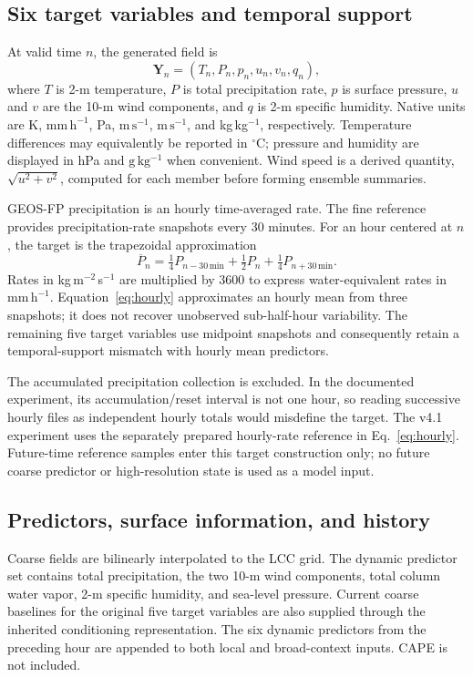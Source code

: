 \documentclass[10pt]{article}
\newcommand{\rainunit}{\mathrm{mm\,h^{-1}}}
\newcommand{\windunit}{\mathrm{m\,s^{-1}}}
\newcommand{\qrate}{\mathrm{g\,kg^{-1}}}
\begin{document}
\subsection{Six target variables and temporal support}
At valid time $n$, the generated field is
\begin{equation}
\mathbf{Y}_n=(T_n,P_n,p_n,u_n,v_n,q_n),
\end{equation}
where $T$ is 2-m temperature, $P$ is total precipitation rate, $p$ is surface pressure, $u$ and $v$ are the 10-m wind components, and $q$ is 2-m specific humidity. Native units are K, $\rainunit$, Pa, $\windunit$, $\windunit$, and kg\,kg$^{-1}$, respectively. Temperature differences may equivalently be reported in $^\circ$C; pressure and humidity are displayed in hPa and $\qrate$ when convenient. Wind speed is a derived quantity, $\sqrt{u^2+v^2}$, computed for each member before forming ensemble summaries.

GEOS-FP precipitation is an hourly time-averaged rate. The fine reference provides precipitation-rate snapshots every 30 minutes. For an hour centered at $n$, the target is the trapezoidal approximation
\begin{equation}
\overline P_n=\tfrac14 P_{n-30\,\mathrm{min}}
+\tfrac12 P_n+\tfrac14 P_{n+30\,\mathrm{min}}.
\label{eq:hourly}
\end{equation}
Rates in kg\,m$^{-2}$\,s$^{-1}$ are multiplied by 3600 to express water-equivalent rates in $\rainunit$. Equation~\eqref{eq:hourly} approximates an hourly mean from three snapshots; it does not recover unobserved sub-half-hour variability. The remaining five target variables use midpoint snapshots and consequently retain a temporal-support mismatch with hourly mean predictors.

The accumulated precipitation collection is excluded. In the documented experiment, its accumulation/reset interval is not one hour, so reading successive hourly files as independent hourly totals would misdefine the target. The v4.1 experiment uses the separately prepared hourly-rate reference in Eq.~\eqref{eq:hourly}. Future-time reference samples enter this target construction only; no future coarse predictor or high-resolution state is used as a model input.

\subsection{Predictors, surface information, and history}
Coarse fields are bilinearly interpolated to the LCC grid. The dynamic predictor set contains total precipitation, the two 10-m wind components, total column water vapor, 2-m specific humidity, and sea-level pressure. Current coarse baselines for the original five target variables are also supplied through the inherited conditioning representation. The six dynamic predictors from the preceding hour are appended to both local and broad-context inputs. CAPE is not included.
\end{document}
